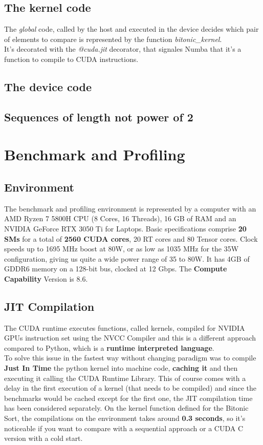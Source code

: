 \documentclass[a4paper, 12pt, oneside]{article}
\begin{document}
\subsection{The kernel code}
The \textit{global} code, called by the host and executed in the device decides which pair of elements to compare is represented by the function \textit{bitonic\_kernel}.\\
It's decorated with the \textit{@cuda.jit} decorator, that signales Numba that it's a function to compile to CUDA instructions.

\subsection{The device code}

\subsection{Sequences of length not power of 2}

\section{Benchmark and Profiling}

\subsection{Environment}
The benchmark and profiling environment is represented by a computer with an AMD Ryzen 7 5800H CPU (8 Cores, 16 Threads), 16 GB of RAM and an NVIDIA GeForce RTX 3050 Ti for Laptops.
Basic specifications comprise \textbf{20 SMs} for a total of \textbf{2560 CUDA cores}, 20 RT cores and 80 Tensor cores. Clock speeds up to 1695 MHz boost at 80W, or as low as 1035 MHz for the 35W configuration, giving us quite a wide power range of 35 to 80W.
It has 4GB of GDDR6 memory on a 128-bit bus, clocked at 12 Gbps.
The \textbf{Compute Capability} Version is 8.6.

\subsection{JIT Compilation}
The CUDA runtime executes functions, called kernels, compiled for NVIDIA GPUs instruction set using the NVCC Compiler \cite{nvcc} and this is a different approach compared to Python, which is a \textbf{runtime interpreted language}.\\
To solve this issue in the fastest way without changing paradigm was to compile \textbf{Just In Time} the python kernel into machine code, \textbf{caching it} and then executing it calling the CUDA Runtime Library.
This of course comes with a delay in the first execution of a kernel (that needs to be compiled) and since the benchmarks would be cached except for the first one, the JIT compilation time has been considered separately.
On the kernel function defined for the Bitonic Sort, the compilations on the environment takes around \textbf{0.3 seconds}, so it's noticeable if you want to compare with a sequential approach or a CUDA C version with a cold start.
\end{document}
